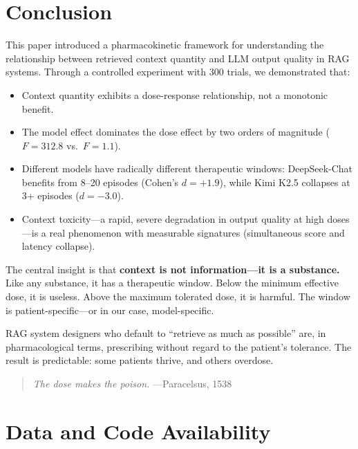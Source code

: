 \documentclass[11pt,a4paper]{article}
\begin{document}
\section{Conclusion}

This paper introduced a pharmacokinetic framework for understanding the relationship between retrieved context quantity and LLM output quality in RAG systems. Through a controlled experiment with 300 trials, we demonstrated that:

\begin{itemize}[itemsep=2pt]
  \item Context quantity exhibits a dose-response relationship, not a monotonic benefit.
  \item The model effect dominates the dose effect by two orders of magnitude ($F = 312.8$ vs.\ $F = 1.1$).
  \item Different models have radically different therapeutic windows: DeepSeek-Chat benefits from 8--20 episodes (Cohen's $d = +1.9$), while Kimi K2.5 collapses at 3+ episodes ($d = -3.0$).
  \item Context toxicity---a rapid, severe degradation in output quality at high doses---is a real phenomenon with measurable signatures (simultaneous score and latency collapse).
\end{itemize}

The central insight is that \textbf{context is not information---it is a substance.} Like any substance, it has a therapeutic window. Below the minimum effective dose, it is useless. Above the maximum tolerated dose, it is harmful. The window is patient-specific---or in our case, model-specific.

RAG system designers who default to ``retrieve as much as possible'' are, in pharmacological terms, prescribing without regard to the patient's tolerance. The result is predictable: some patients thrive, and others overdose.

\begin{quote}
\textit{The dose makes the poison.} ---Paracelsus, 1538
\end{quote}

\section*{Data and Code Availability}
\end{document}
